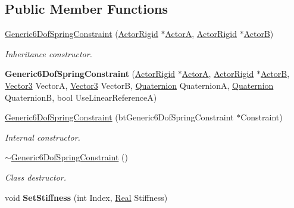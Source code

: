 \subsection*{Public Member Functions}
\begin{DoxyCompactItemize}
\item 
\hyperlink{classphys_1_1Generic6DofSpringConstraint_a88cf5bfb5db55b957652831c3295b56a}{Generic6DofSpringConstraint} (\hyperlink{classphys_1_1ActorRigid}{ActorRigid} $\ast$\hyperlink{classphys_1_1TypedConstraint_a0fefb80c80d433bec9942b851b2f5a8a}{ActorA}, \hyperlink{classphys_1_1ActorRigid}{ActorRigid} $\ast$\hyperlink{classphys_1_1TypedConstraint_a04d2c49698d9a161e92112dd1efc1dcd}{ActorB})
\begin{DoxyCompactList}\small\item\em Inheritance constructor. \item\end{DoxyCompactList}\item 
\hypertarget{classphys_1_1Generic6DofSpringConstraint_afedaa8d86366f831bbde91e0825ae632}{
{\bfseries Generic6DofSpringConstraint} (\hyperlink{classphys_1_1ActorRigid}{ActorRigid} $\ast$\hyperlink{classphys_1_1TypedConstraint_a0fefb80c80d433bec9942b851b2f5a8a}{ActorA}, \hyperlink{classphys_1_1ActorRigid}{ActorRigid} $\ast$\hyperlink{classphys_1_1TypedConstraint_a04d2c49698d9a161e92112dd1efc1dcd}{ActorB}, \hyperlink{classphys_1_1Vector3}{Vector3} VectorA, \hyperlink{classphys_1_1Vector3}{Vector3} VectorB, \hyperlink{classphys_1_1Quaternion}{Quaternion} QuaternionA, \hyperlink{classphys_1_1Quaternion}{Quaternion} QuaternionB, bool UseLinearReferenceA)}
\label{d1/dc7/classphys_1_1Generic6DofSpringConstraint_afedaa8d86366f831bbde91e0825ae632}

\item 
\hyperlink{classphys_1_1Generic6DofSpringConstraint_aecd43f6209799587aacee584d3840491}{Generic6DofSpringConstraint} (btGeneric6DofSpringConstraint $\ast$Constraint)
\begin{DoxyCompactList}\small\item\em Internal constructor. \item\end{DoxyCompactList}\item 
\hyperlink{classphys_1_1Generic6DofSpringConstraint_a245aa769d0b19ff01acf77e78e959cad}{$\sim$Generic6DofSpringConstraint} ()
\begin{DoxyCompactList}\small\item\em Class destructor. \item\end{DoxyCompactList}\item 
\hypertarget{classphys_1_1Generic6DofSpringConstraint_a44b8d8d1616251d09dfe61ecc2f84a02}{
void {\bfseries SetStiffness} (int Index, \hyperlink{namespacephys_af7eb897198d265b8e868f45240230d5f}{Real} Stiffness)}
\label{d1/dc7/classphys_1_1Generic6DofSpringConstraint_a44b8d8d1616251d09dfe61ecc2f84a02}


\end{DoxyCompactItemize}
